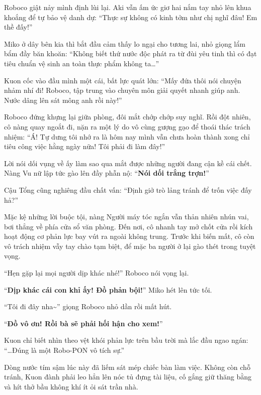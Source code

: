 \documentclass[../main.tex]{subfiles}
\begin{document}
Roboco giật nảy mình định lùi lại. Aki vẫn ấm ức giơ hai nắm tay nhỏ lên khua khoắng để tự bảo vệ danh dự:
``Thực sự không có kinh tởm như chị nghĩ đâu! Em thề đấy!''

Miko ở dây bên kia thì bắt đầu cảm thấy lo ngại cho tương lai, nhỏ giọng lẩm bẩm đầy băn khoăn:
``Không biết thứ nước độc phát ra từ đùi yêu tinh thì có đạt tiêu chuẩn vệ sinh an toàn thực phẩm không ta\dots''

Kuon cốc vào đầu mình một cái, bất lực quát lớn:
``Mấy đứa thôi nói chuyện nhảm nhí đi! Roboco, tập trung vào chuyên môn giải quyết nhanh giúp anh. Nước dâng lên sát mông anh rồi này!''

Roboco đứng khựng lại giữa phòng, đôi mắt chớp chớp suy nghĩ. Rồi đột nhiên, cô nàng quay ngoắt đi, nặn ra một lý do vô cùng gượng gạo để thoái thác trách nhiệm:
``Á! Tự dưng tôi nhớ ra là hôm nay mình vẫn chưa hoàn thành xong chỉ tiêu công việc hằng ngày nữa! Tôi phải đi làm đây!''

Lời nói dối vụng về ấy làm sao qua mắt được những người đang cận kề cái chết. Nàng Vu nữ lập tức gào lên đầy phẫn nộ:
``\textbf{Nói dối trắng trợn!}''

Cậu Tổng cũng nghiêng đầu chất vấn:
``Định giở trò lảng tránh để trốn việc đấy hả?''


Mặc kệ những lời buộc tội, nàng Người máy tóc ngắn vẫn thản nhiên nhún vai, bơi thẳng về phía cửa sổ văn phòng. Đến nơi, cô nhanh tay mở chốt cửa rồi kích hoạt động cơ phản lực bay vút ra ngoài không trung. Trước khi biến mất, cô còn vô trách nhiệm vẫy tay chào tạm biệt, để mặc ba người ở lại gào thét trong tuyệt vọng.

``Hẹn gặp lại mọi người dịp khác nhé!''  Roboco nói vọng lại.

``\textbf{Dịp khác cái con khỉ ấy! Đồ phản bội!}'' Miko hét lên tức tối.

``Tôi đi đây nha\~{}'' giọng Roboco nhỏ dần rồi mất hút.

``\textbf{Đồ vô ơn! Rồi bà sẽ phải hối hận cho xem!}''

Kuon chỉ biết nhìn theo vệt khói phản lực trên bầu trời mà lắc đầu ngao ngán: ``\dots Đúng là một Robo-PON vô tích sự.''

\ct

Dòng nước tím sậm lúc này đã liếm sát mép chiếc bàn làm việc. Không còn chỗ tránh, Kuon đành phải leo hẳn lên nóc tủ đựng tài liệu, cố gắng giữ thăng bằng và hít thở bầu không khí ít ỏi sát trần nhà.
\end{document}
